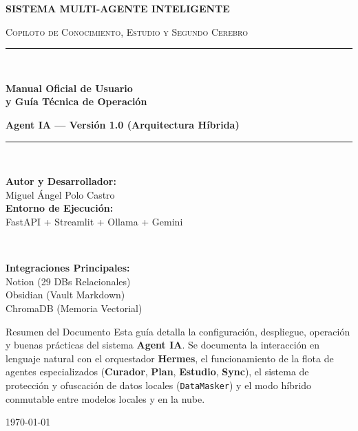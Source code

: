 \documentclass[11pt,a4paper]{article}
\begin{document}
\begin{titlepage}
    \centering
    \vspace*{1.0cm}
    {\scshape\LARGE\bfseries\color{primary} SISTEMA MULTI-AGENTE INTELIGENTE \par}
    \vspace{0.4cm}
    {\scshape\large Copiloto de Conocimiento, Estudio y Segundo Cerebro \par}
    \vspace{1.5cm}
    
    \rule{\linewidth}{1.8pt}\\[0.4cm]
    {\Huge\bfseries\color{primary} Manual Oficial de Usuario\\[0.2cm] y Guía Técnica de Operación \par}
    \vspace{0.2cm}
    {\large\color{accent}\textbf{Agent IA --- Versión 1.0 (Arquitectura Híbrida)} \par}
    \rule{\linewidth}{1.8pt}\\[1.5cm]
    
    \begin{minipage}{0.48\textwidth}
        \begin{flushleft} \large
            \textbf{Autor y Desarrollador:}\\
            Miguel Ángel Polo Castro\\[0.3cm]
            \textbf{Entorno de Ejecución:}\\
            FastAPI + Streamlit + Ollama + Gemini
        \end{flushleft}
    \end{minipage}
    ~
    \begin{minipage}{0.48\textwidth}
        \begin{flushright} \large
            \textbf{Integraciones Principales:}\\
            Notion (29 DBs Relacionales)\\
            Obsidian (Vault Markdown)\\
            ChromaDB (Memoria Vectorial)
        \end{flushright}
    \end{minipage}
    
    \vfill
    
    \begin{infobox}{Resumen del Documento}
        Esta guía detalla la configuración, despliegue, operación y buenas prácticas del sistema \textbf{Agent IA}. Se documenta la interacción en lenguaje natural con el orquestador \textbf{Hermes}, el funcionamiento de la flota de agentes especializados (\textbf{Curador}, \textbf{Plan}, \textbf{Estudio}, \textbf{Sync}), el sistema de protección y ofuscación de datos locales (\texttt{DataMasker}) y el modo híbrido conmutable entre modelos locales y en la nube.
    \end{infobox}
    
    \vspace{0.8cm}
    {\large \today \par}
\end{titlepage}
\end{document}
